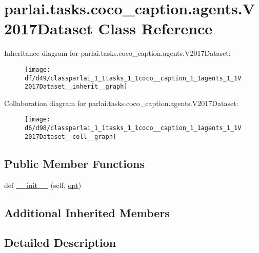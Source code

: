 \hypertarget{classparlai_1_1tasks_1_1coco__caption_1_1agents_1_1V2017Dataset}{}\section{parlai.\+tasks.\+coco\+\_\+caption.\+agents.\+V2017\+Dataset Class Reference}
\label{classparlai_1_1tasks_1_1coco__caption_1_1agents_1_1V2017Dataset}


Inheritance diagram for parlai.\+tasks.\+coco\+\_\+caption.\+agents.\+V2017\+Dataset\+:\nopagebreak
\begin{figure}[H]
\begin{center}
\leavevmode
\texttt{[image: df/d49/classparlai\_1\_1tasks\_1\_1coco\_\_caption\_1\_1agents\_1\_1V2017Dataset\_\_inherit\_\_graph]}
\end{center}
\end{figure}


Collaboration diagram for parlai.\+tasks.\+coco\+\_\+caption.\+agents.\+V2017\+Dataset\+:\nopagebreak
\begin{figure}[H]
\begin{center}
\leavevmode
\texttt{[image: d6/d98/classparlai\_1\_1tasks\_1\_1coco\_\_caption\_1\_1agents\_1\_1V2017Dataset\_\_coll\_\_graph]}
\end{center}
\end{figure}
\subsection*{Public Member Functions}
\begin{DoxyCompactItemize}
\item 
def \hyperlink{classparlai_1_1tasks_1_1coco__caption_1_1agents_1_1V2017Dataset_a7469de10b2d6e7c7563e3bf713cd216e}{\+\_\+\+\_\+init\+\_\+\+\_\+} (self, \hyperlink{classparlai_1_1tasks_1_1coco__caption_1_1agents_1_1DefaultDataset_adaa89b61b63ef4c1291774fda7abaf3c}{opt})
\end{DoxyCompactItemize}
\subsection*{Additional Inherited Members}


\subsection{Detailed Description}


